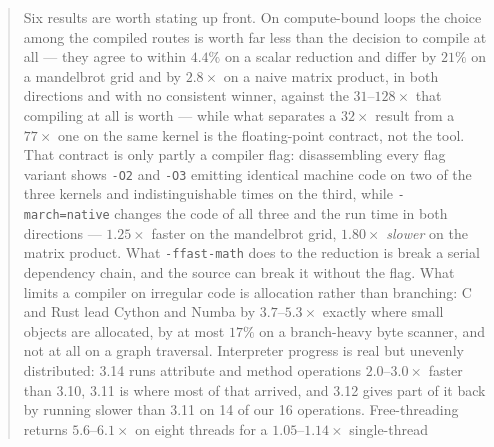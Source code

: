 \documentclass[10pt,a4paper]{article}
\newcommand{\meas}[2]{#2}
\newcommand{\code}[1]{\texttt{\small #1}}
\begin{document}
\begin{abstract}
Six results are worth stating up front. On compute-bound loops the choice among the compiled
routes is worth far less than the decision to compile at all --- they agree to within
$\meas{pct:b1_compute-314:arraysum/codon_jit|b1_compute-314:arraysum/codon_pyext_ptr}{4.4}\%$ on a scalar reduction and differ by $\meas{pct:b1_compute-314:mandelbrot/codon_jit|b1_compute-314:mandelbrot/cython}{21}\%$ on a mandelbrot grid and by $\meas{ratio:b1_compute-314:matmul/codon_jit|b1_compute-314:matmul/numba}{2.8}\times$ on a
naive matrix product, in both directions and with no consistent winner, against the
$31$--$\meas{ratio:b1_compute-314:matmul/cpython_loop|b1_compute-314:matmul/numba}{128}\times$ that compiling at all is worth --- while what separates a $\meas{ratio:b1_compute-314:arraysum/cpython_loop|b1_compute-314:arraysum/numba}{32}\times$ result
from a $\meas{ratio:b1_compute-314:arraysum/cpython_loop|b1_compute-314:arraysum/numba_fastmath}{77}\times$ one on the same kernel is the floating-point contract, not the tool. That
contract is only partly a compiler flag: disassembling every flag variant shows \code{-O2} and
\code{-O3} emitting identical machine code on two of the three kernels and indistinguishable
times on the third, while \code{-march=native} changes the code of all three and the run time in
both directions --- $\meas{ratio:b1_flags-314:mandelbrot/O2|b1_flags-314:mandelbrot/O3native}{1.25}\times$ faster on the mandelbrot grid, $\meas{ratio:b1_flags-314:matmul/O3native|b1_flags-314:matmul/O2}{1.80}\times$ \emph{slower} on the
matrix product. What \code{-ffast-math} does to the reduction is break a serial dependency
chain, and the source can break it without the flag. What limits a compiler on irregular code is allocation
rather than branching: C and Rust lead Cython and Numba by $3.7$--$\meas{ratio:b2_branchy-314:binarytrees/numba|b2_branchy-314:binarytrees/rust_ctypes}{5.3}\times$ exactly where small
objects are allocated, by at most $\meas{pct:b2_branchy-314:tokenize/numba|b2_branchy-314:tokenize/c_ctypes}{17}\%$ on a branch-heavy byte scanner, and not at all on a
graph traversal.
Interpreter progress is real but unevenly distributed: 3.14 runs attribute and method
operations $2.0$--$\meas{ratio:b3_runtime-v310:attr_set/v310|b3_runtime-v314:attr_set/v314}{3.0}\times$ faster than 3.10, 3.11 is where most of that arrived, and 3.12
gives part of it back by running slower than 3.11 on 14 of our 16 operations. Free-threading
returns $5.6$--$\meas{ratio:b4_threads-ft:py_branchy/ft/T1_control|b4_threads-ft:py_branchy/ft/T8}{6.1}\times$ on eight threads for a $1.05$--$\meas{ratio:b4_threads-ft:single_thread_arith/ft|b4_threads-gil:single_thread_arith/gil}{1.14}\times$ single-thread

\end{abstract}
\end{document}
